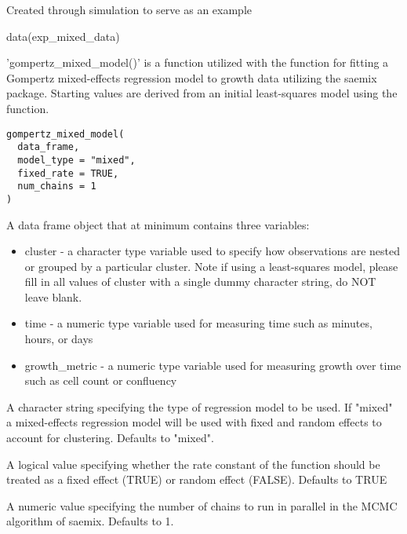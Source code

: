 \documentclass[a4paper]{book}
\begin{document}
%
\begin{Source}
Created through simulation to serve as an example
\end{Source}
%
\begin{Examples}
\begin{ExampleCode}
data(exp_mixed_data)
\end{ExampleCode}
\end{Examples}
%
\begin{Description}
'gompertz\_mixed\_model()' is a function utilized with the
 function for fitting a Gompertz
mixed-effects regression model to growth data utilizing the saemix package.
Starting values are derived from an initial least-squares model using
the  function.
\end{Description}
%
\begin{Usage}
\begin{verbatim}
gompertz_mixed_model(
  data_frame,
  model_type = "mixed",
  fixed_rate = TRUE,
  num_chains = 1
)
\end{verbatim}
\end{Usage}
%
\begin{Arguments}
\begin{ldescription}
\item[\code{data\_frame}] A data frame object that at minimum contains three
variables:
\begin{itemize}

\item{} cluster - a character type variable used to specify how observations
are nested or grouped by a particular cluster. Note if using a
least-squares model, please fill in all values of cluster with a single
dummy character string, do NOT leave blank.
\item{} time - a numeric type variable used for measuring time such as
minutes, hours, or days
\item{} growth\_metric - a numeric type variable used for measuring growth
over time such as cell count or confluency

\end{itemize}


\item[\code{model\_type}] A character string specifying the type of regression
model to be used. If "mixed" a mixed-effects regression model will be used
with fixed and random effects to account for clustering. Defaults to "mixed".

\item[\code{fixed\_rate}] A logical value specifying whether the rate constant
of the function should be treated as a fixed effect (TRUE) or random
effect (FALSE). Defaults to TRUE

\item[\code{num\_chains}] A numeric value specifying the number of chains to run
in parallel in the MCMC algorithm of saemix. Defaults to 1.
\end{ldescription}
\end{Arguments}
\end{document}
